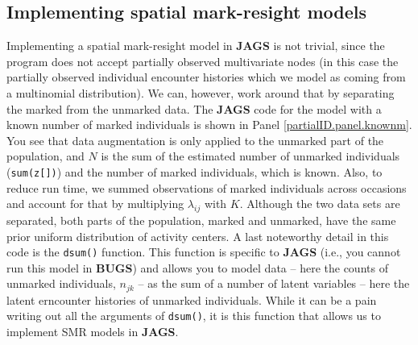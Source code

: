 \subsection{Implementing spatial mark-resight models}
Implementing a spatial mark-resight model in {\bf JAGS} is not
trivial, since the program does not accept partially observed
multivariate nodes (in this case the partially observed individual
encounter histories which we model as coming from a multinomial
distribution). We can, however, work around that by separating the marked from the unmarked data. The {\bf JAGS} code for the model with a known number of marked individuals is shown in Panel \ref{partialID.panel.knownm}. You see that data augmentation is only applied to the unmarked part of the population, and $N$ is the sum of the estimated number of unmarked individuals ({\tt sum(z[])}) and the number of marked individuals, which is known. Also, to reduce run time, we summed observations of marked individuals across occasions and account for that by multiplying $\lambda_{ij}$ with $K$. Although the two data sets are separated, both parts of the population, marked and unmarked, have the same prior uniform distribution of activity centers.
A last noteworthy detail in this code is the {\tt dsum()} function. This function is specific to {\bf JAGS} (i.e., you cannot run this model in {\bf BUGS}) and allows you to model data -- here the counts of unmarked individuals, $n_{jk}$ -- as the sum of a number of latent variables -- here the latent erncounter histories of unmarked individuals. While it can be a pain writing out all the arguments of {\tt dsum()}, it is this function that allows us to implement SMR models in {\bf JAGS}.

